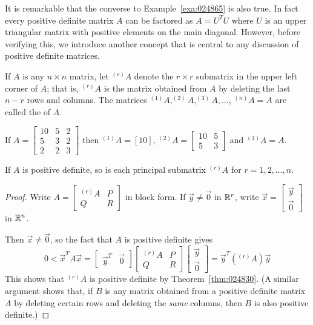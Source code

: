 \documentclass{ximera}
\begin{document}
It is remarkable that the converse to Example~\ref{exa:024865} is also true. In fact every positive definite matrix $A$ can be factored as $A = U^{T}U$ where $U$ is an upper triangular matrix with positive elements on the main
diagonal. However, before verifying this, we introduce another concept
that is central to any discussion of positive definite matrices.


If $A$ is any $n \times n$ matrix, let $^{(r)}A$ denote the $r \times r$ submatrix in the upper left corner of $A$; that is, $^{(r)}A$ is the matrix obtained from $A$ by deleting the last $n - r$ rows and columns. The matrices $^{(1)}A, ^{(2)}A, ^{(3)}A, \dots$, $^{(n)}A = A$ are called the  of $A$.


\begin{example}\label{exa:024883}
If $A = \left[ \begin{array}{rrr}
10 & 5 & 2 \\
5 & 3 & 2 \\
2 & 2 & 3
\end{array}\right]$ then $^{(1)}A = \left[ 10 \right]$, $^{(2)}A = \left[ \begin{array}{rr}
10 & 5 \\
5 & 3
\end{array}\right]$ and $^{(3)}A = A$.
\end{example}

\begin{lemma}\label{lem:024890}
If $A$ is positive definite, so is each principal submatrix $^{(r)}A$ for $r = 1, 2, \dots, n$.
\end{lemma}

\begin{proof}
Write $A = \left[ \begin{array}{rr}
^{(r)}A & P \\
Q & R
\end{array}\right]$
 in block form. If $\vec{y} \neq \vec{0}$ in $\mathbb{R}^r$, write $\vec{x} = \left[ \begin{array}{r}
 \vec{y} \\
 \vec{0}
 \end{array}\right]$ in $\mathbb{R}^n$.

Then $\vec{x} \neq \vec{0}$, so the fact that $A$ is positive definite gives
\begin{equation*}
0 < \vec{x}^TA\vec{x} = \left[ \begin{array}{rr}
\vec{y}^T & \vec{0}
\end{array}\right] \left[ \begin{array}{rr}
^{(r)}A & P \\
Q & R
\end{array}\right] \left[ \begin{array}{r}
\vec{y} \\
\vec{0}
\end{array}\right] = \vec{y}^T(^{(r)}A)\vec{y}
\end{equation*}
This shows that $^{(r)}A$ is positive definite by Theorem~\ref{thm:024830}. (A similar argument shows that, if $B$ is any matrix obtained from a positive definite matrix $A$ by deleting certain rows and deleting the \textit{same} columns, then $B$ is also positive definite.)
\end{proof}
\end{document}
